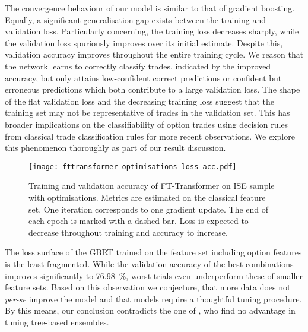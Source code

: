 The convergence behaviour of our model is similar to that of gradient boosting. Equally, a significant generalisation gap exists between the training and validation loss. Particularly concerning, the training loss decreases sharply, while the validation loss spuriously improves over its initial estimate. Despite this, validation accuracy improves throughout the entire training cycle. We reason that the network learns to correctly classify trades, indicated by the improved accuracy, but only attains low-confident correct predictions or confident but erroneous predictions which both contribute to a large validation loss. The shape of the flat validation loss and the decreasing training loss suggest that the training set may not be representative of trades in the validation set. This has broader implications on the classifiability of option trades using decision rules from classical trade classification rules for more recent observations. We explore this phenomenon thoroughly as part of our result discussion.

\begin{figure}[!ht]
    \centering
    \texttt{[image: fttransformer-optimisations-loss-acc.pdf]}
    \caption[Training and Validation Accuracy of FT-Transformer on  with Optimisations]{Training and validation accuracy of FT-Transformer on \gls{ISE} sample with optimisations. Metrics are estimated on the classical feature set. One iteration corresponds to one gradient update. The end of each epoch is marked with a dashed bar. Loss is expected to decrease throughout training and accuracy to increase.}
    \label{fig:fttransformer-optimisations-loss-acc}
\end{figure}


The loss surface of the \gls{GBRT} trained on the feature set including option features is the least fragmented. While the validation accuracy of the best combinations improves significantly to \SI{76.98}{\percent}, worst trials even underperform these of smaller feature sets. Based on this observation we conjecture, that more data does not \emph{per-se} improve the model and that models require a thoughtful tuning procedure. By this means, our conclusion contradicts the one of \textcite[][14]{ronenMachineLearningTrade2022}, who find no advantage in tuning tree-based ensembles.

